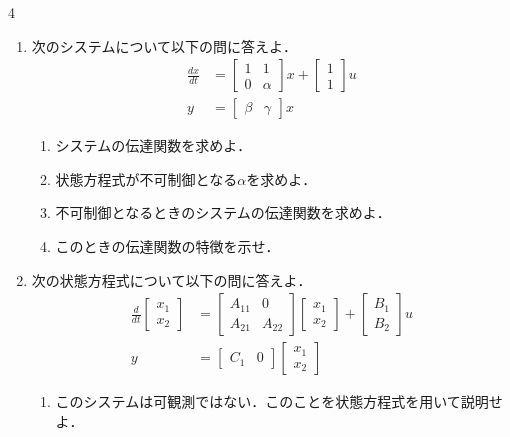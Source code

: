 \documentclass[fleqn]{article}
\renewcommand{\bmatrix}{\left[\begin{array}}
\newcommand{\ematrix}{\end{array}\right]}
\begin{document}
\begin{multicols}{4}
\begin{enumerate}
\item
次のシステムについて以下の問に答えよ．
\begin{align}
	\frac{dx}{dt}
	&=	\bmatrix{cc}
			1 & 1 \\
			0 & \alpha
		\ematrix
		x
		+
		\bmatrix{c}
			1 \\
			1 
		\ematrix
		u
\nonumber \\
	y 
	&=	\bmatrix{cc}
			\beta & \gamma 
		\ematrix
		x
\nonumber 
\end{align}

\begin{enumerate}

\item 
システムの伝達関数を求めよ．
\vspace{6cm}

\item
状態方程式が不可制御となる$\alpha$を求めよ．
\vspace{6cm}

\item
不可制御となるときのシステムの伝達関数を求めよ．
\vspace{6cm}

\item
このときの伝達関数の特徴を示せ．

\end{enumerate}
\vfill\null
\columnbreak




\item
次の状態方程式について以下の問に答えよ．
\begin{align}
	\frac{d}{dt}
	\bmatrix{c}
		x_1 \\
		x_2
	\ematrix
	&=	\bmatrix{ll}
			A_{11} & 0 \\
			A_{21} & A_{22}
		\ematrix
		\bmatrix{c}
			x_1 \\
			x_2
		\ematrix
		+
		\bmatrix{c}
			B_1 \\
			B_2
		\ematrix
		u
\nonumber \\
	y 
	&=	\bmatrix{cc}
			C_1 & 0 
		\ematrix
		\bmatrix{c}
			x_1 \\
			x_2
		\ematrix
\nonumber
\end{align}

\begin{enumerate}
\item 
このシステムは可観測ではない．このことを状態方程式を用いて説明せよ．
\vspace{6cm}


\end{enumerate}
\end{enumerate}
\end{multicols}
\end{document}
